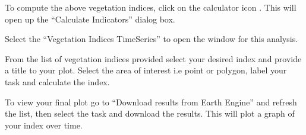\documentclass[letterpaper,10pt,english]{sphinxmanual}
\begin{document}
\sphinxAtStartPar
To compute the above vegetation indices, click on the calculator icon . This will open up the
“Calculate Indicators” dialog box.


\sphinxAtStartPar
Select the “Vegetation Indices Time\sphinxhyphen{}Series” to open the window for this analysis.


\sphinxAtStartPar
From the list of vegetation indices provided select your desired index and provide a title to your
plot. Select the area of interest i.e point or polygon, label your task and calculate the index.


\sphinxAtStartPar
To view your final plot go to “Download results from Earth Engine” and refresh the list, then select
the task and download the results. This will plot a graph of your index over time.



\sphinxstepscope
\end{document}
